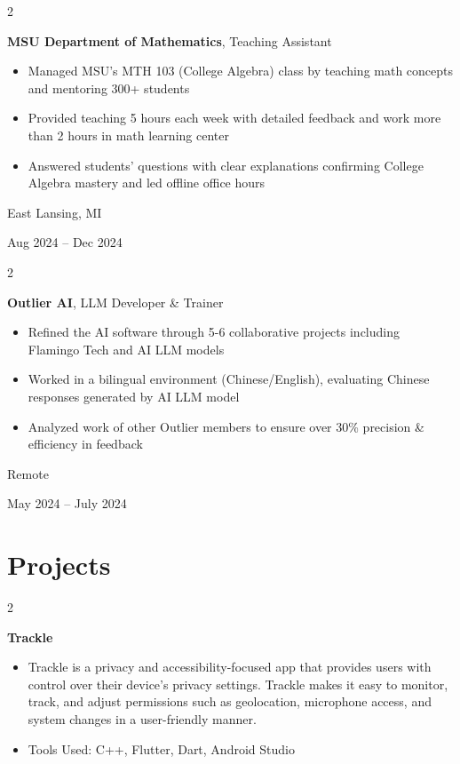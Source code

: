 \documentclass[10pt, letterpaper]{article}
\newenvironment{highlights}{
    \begin{itemize}[
        topsep=0.10 cm,
        parsep=0.10 cm,
        partopsep=0pt,
        itemsep=0pt,
        leftmargin=0.4 cm + 10pt
    ]
}{
    \end{itemize}
} %
\newenvironment{twocolentry}[2][]{
    \onecolentry
    \def\secondColumn{#2}
    \setcolumnwidth{\fill, 4.5 cm}
    \begin{paracol}{2}
}{
    \switchcolumn \raggedleft \secondColumn
    \end{paracol}
    \endonecolentry
} %
\let\hrefWithoutArrow\href
\renewcommand{\href}[2]{\hrefWithoutArrow{#1}{\ifthenelse{\equal{#2}{}}{ }{#2 }\raisebox{.15ex}{\footnotesize \faExternalLink*}}}
\begin{document}
        \vspace{0.2 cm}

        \begin{twocolentry}{
            East Lansing, MI

        Aug 2024 – Dec 2024
        }
            \textbf{MSU Department of Mathematics}, Teaching Assistant
            \begin{highlights}
                \item Managed MSU’s MTH 103 (College Algebra) class by teaching math concepts and mentoring 300+ students
                \item Provided teaching 5 hours each week with detailed feedback and work more than 2 hours in math learning center
                \item Answered students' questions with clear explanations confirming College Algebra mastery and led offline office hours
            \end{highlights}
        \end{twocolentry}


        \vspace{0.2 cm}

        \begin{twocolentry}{
            Remote

        May 2024 – July 2024
        }
            \textbf{Outlier AI}, LLM Developer \& Trainer
            \begin{highlights}
                \item Refined the AI software through 5-6 collaborative projects including Flamingo Tech and AI LLM models
                \item Worked in a bilingual environment (Chinese/English), evaluating Chinese responses generated by AI LLM model
                \item Analyzed work of other Outlier members to ensure over 30\% precision \& efficiency in feedback
            \end{highlights}
        \end{twocolentry}



    
    \section{Projects}



        
        \begin{twocolentry}{
            \href{https://github.com/programmeruser517/Trackle}{github repo}
        }
            \textbf{Trackle}
            \begin{highlights}
                \item Trackle is a privacy and accessibility-focused app that provides users with control over their device’s privacy settings. Trackle makes it easy to monitor, track, and adjust permissions such as geolocation, microphone access, and system changes in a user-friendly manner.
                \item Tools Used: C++, Flutter, Dart, Android Studio
            \end{highlights}
        \end{twocolentry}
\end{document}
